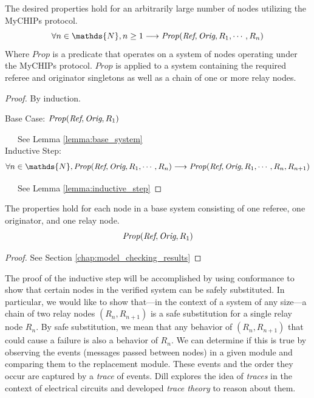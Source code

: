 \documentclass[runningheads]{llncs}
\newcommand{\secref}[1]{Section \ref{#1}}
\newif\ifcomments
\newif\ifkylecomments
\newcommand{\egm}[1]{\ifcomments\textcolor{orange}{egm: #1}\fi}
\newcommand{\krs}[1]{\ifkylecomments\textcolor{blue}{krs: #1}\fi}
\begin{document}
\begin{theorem}
The desired properties hold for an arbitrarily large number of nodes utilizing the MyCHIPs protocol.
$$
\forall n \in \mathds{N}, n \ge 1 \longrightarrow \mathit{Prop}(\emph{Ref}, \emph{Orig}, R_1, \dotsm, R_n)
$$
Where $\mathit{Prop}$ is a predicate that operates on a system of nodes operating under the MyCHIPs protocol. $\mathit{Prop}$ is applied to a system containing the required referee and originator singletons as well as a chain of one or more relay nodes.
\krs{fixed: \egm{I tend to spell out small numbers. So `1` would be one, etc. That is the style that I was taught and use consistently.}}

\begin{proof}
   By induction.
   
   Base Case: 
    $
    \mathit{Prop}(\emph{Ref}, \emph{Orig}, R_1)
    $

   \ \ \ See Lemma \ref{lemma:base_system}
   \\
   
   Inductive Step:
    \begin{multline*}
    \forall n \in \mathds{N}, \mathit{Prop}(\emph{Ref}, \emph{Orig}, R_1, \dotsm, R_n) \longrightarrow \mathit{Prop}(\emph{Ref}, \emph{Orig}, R_1, \dotsm, R_n, R_{n+1})
    \end{multline*}
   
   \ \ \ See Lemma \ref{lemma:inductive_step}
\end{proof}
\end{theorem}


\begin{lemma}
\label{lemma:base_system}
The properties hold for each node in a base system consisting of one referee, one originator, and one relay node.
$$
\mathit{Prop}(\emph{Ref}, \emph{Orig}, R_1)
$$
\begin{proof}
    See \secref{chap:model_checking_results}
\end{proof}
\end{lemma}

The proof of the inductive step will be accomplished by using conformance to show that certain nodes in the verified system can be safely substituted. 
In particular, we would like to show that---in the context of a system of any size---a chain of two relay nodes $(R_n, R_{n+1})$ is a safe substitution for a single relay node $R_n$. By safe substitution, we mean that any behavior of $(R_n, R_{n+1})$ that could cause a failure is also a behavior of $R_n$. We can determine if this is true by observing the events (messages passed between nodes) in a given module and comparing them to the replacement module. These events and the order they occur are captured by a \emph{trace} of events. Dill explores the idea of \emph{traces} in the context of electrical circuits and developed \emph{trace theory} to reason about them. 
\end{document}
